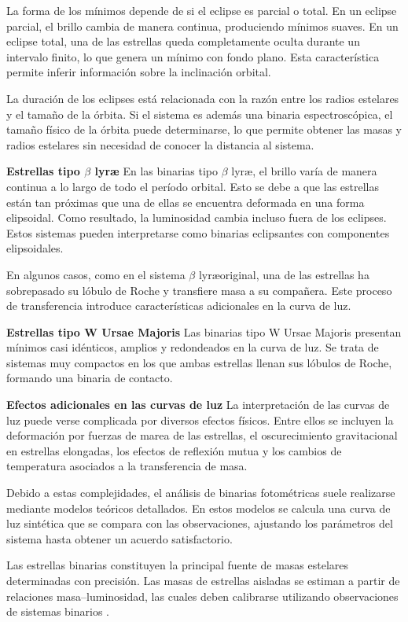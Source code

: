 \documentclass[12pt,letterpaper,oneside]{book}
\begin{document}
La forma de los mínimos depende de si el eclipse es parcial o total. En un eclipse parcial, el brillo cambia de manera continua, produciendo mínimos suaves. En un eclipse total, una de las estrellas queda completamente oculta durante un intervalo finito, lo que genera un mínimo con fondo plano. Esta característica permite inferir información sobre la inclinación orbital.

La duración de los eclipses está relacionada con la razón entre los radios estelares y el tamaño de la órbita. Si el sistema es además una binaria espectroscópica, el tamaño físico de la órbita puede determinarse, lo que permite obtener las masas y radios estelares sin necesidad de conocer la distancia al sistema.

\textbf{Estrellas tipo $\beta$ lyr\ae} En las binarias tipo $\beta$ lyr\ae, el brillo varía de manera continua a lo largo de todo el período orbital. Esto se debe a que las estrellas están tan próximas que una de ellas se encuentra deformada en una forma elipsoidal. Como resultado, la luminosidad cambia incluso fuera de los eclipses. Estos sistemas pueden interpretarse como binarias eclipsantes con componentes elipsoidales.

En algunos casos, como en el sistema $\beta$ lyr\ae original, una de las estrellas ha sobrepasado su lóbulo de Roche y transfiere masa a su compañera. Este proceso de transferencia introduce características adicionales en la curva de luz.

\textbf{Estrellas tipo W Ursae Majoris} Las binarias tipo W Ursae Majoris presentan mínimos casi idénticos, amplios y redondeados en la curva de luz. Se trata de sistemas muy compactos en los que ambas estrellas llenan sus lóbulos de Roche, formando una binaria de contacto.

\textbf{Efectos adicionales en las curvas de luz} La interpretación de las curvas de luz puede verse complicada por diversos efectos físicos. Entre ellos se incluyen la deformación por fuerzas de marea de las estrellas, el oscurecimiento gravitacional en estrellas elongadas, los efectos de reflexión mutua y los cambios de temperatura asociados a la transferencia de masa.

Debido a estas complejidades, el análisis de binarias fotométricas suele realizarse mediante modelos teóricos detallados. En estos modelos se calcula una curva de luz sintética que se compara con las observaciones, ajustando los parámetros del sistema hasta obtener un acuerdo satisfactorio.

Las estrellas binarias constituyen la principal fuente de masas estelares determinadas con precisión. Las masas de estrellas aisladas se estiman a partir de relaciones masa--luminosidad, las cuales deben calibrarse utilizando observaciones de sistemas binarios \cite{Karttunen2016}.
\end{document}
